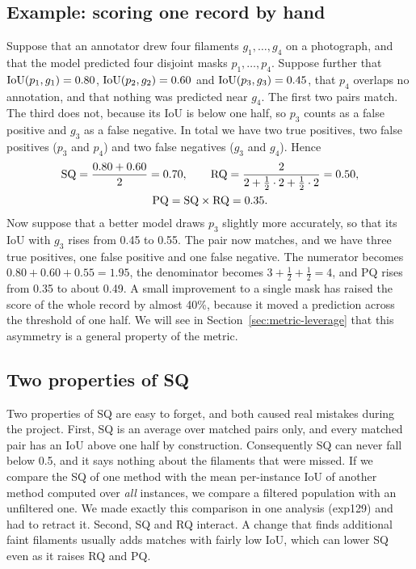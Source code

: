 \subsection{Example: scoring one record by hand}\label{sec:metric-example}
Suppose that an annotator drew four filaments $g_1,\dots,g_4$ on a photograph, and that the model
predicted four disjoint masks $p_1,\dots,p_4$. Suppose further that $\mathrm{IoU}(p_1,g_1)=0.80$,
$\mathrm{IoU}(p_2,g_2)=0.60$ and $\mathrm{IoU}(p_3,g_3)=0.45$, that $p_4$ overlaps no annotation, and that nothing
was predicted near $g_4$. The first two pairs match. The third does not, because its IoU is below
one half, so $p_3$ counts as a false positive and $g_3$ as a false negative. In total we have two
true positives, two false positives ($p_3$ and $p_4$) and two false negatives ($g_3$ and $g_4$).
Hence
\begin{gather*}
\mathrm{SQ}=\frac{0.80+0.60}{2}=0.70,\qquad
\mathrm{RQ}=\frac{2}{2+\tfrac12\cdot2+\tfrac12\cdot2}=0.50,\\
\mathrm{PQ}=\mathrm{SQ}\times\mathrm{RQ}=0.35 .
\end{gather*}
Now suppose that a better model draws $p_3$ slightly more accurately, so that its IoU with $g_3$
rises from 0.45 to 0.55. The pair now matches, and we have three true positives, one false
positive and one false negative. The numerator becomes $0.80+0.60+0.55=1.95$, the denominator
becomes $3+\tfrac12+\tfrac12=4$, and PQ rises from 0.35 to about 0.49. A small improvement to a
single mask has raised the score of the whole record by almost 40\%, because it moved a prediction across
the threshold of one half. We will see in Section~\ref{sec:metric-leverage} that this asymmetry is
a general property of the metric.

\subsection{Two properties of SQ}\label{sec:metric-sq-properties}
Two properties of SQ are easy to forget, and both caused real mistakes during the project. First,
SQ is an average over matched pairs only, and every matched pair has an IoU above one half by
construction. Consequently SQ can never fall below 0.5, and it says nothing about the filaments
that were missed. If we compare the SQ of one method with the mean per-instance IoU of another
method computed over \emph{all} instances, we compare a filtered population with an unfiltered one.
We made exactly this comparison in one analysis (exp129) and had to retract it. Second, SQ and RQ
interact. A change that finds additional faint filaments usually adds matches with fairly low IoU,
which can lower SQ even as it raises RQ and PQ.


